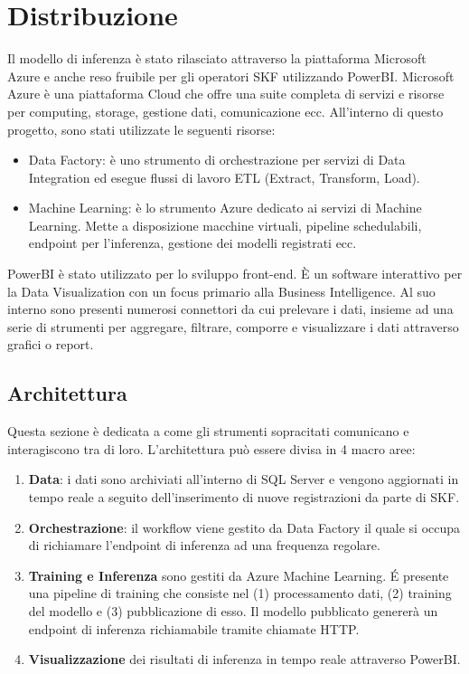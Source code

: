 \chapter{Distribuzione}
\label{chap:deploy}

Il modello di inferenza è stato rilasciato attraverso la piattaforma Microsoft Azure e anche reso fruibile per gli operatori SKF utilizzando PowerBI.
Microsoft Azure è una piattaforma Cloud che offre una suite completa di servizi e risorse per computing, storage, gestione dati, comunicazione ecc.
All'interno di questo progetto, sono stati utilizzate le seguenti risorse:
\begin{itemize}
	\item Data Factory: è uno strumento di orchestrazione per servizi di Data Integration ed esegue flussi di lavoro ETL (Extract, Transform, Load).
	\item Machine Learning: è lo strumento Azure dedicato ai servizi di Machine Learning. Mette a disposizione macchine virtuali, pipeline schedulabili, endpoint per l'inferenza, gestione dei modelli registrati ecc.
\end{itemize}

PowerBI è stato utilizzato per lo sviluppo front-end. È un software interattivo per la Data Visualization con un focus primario alla Business Intelligence. Al suo interno sono presenti numerosi connettori da cui prelevare i dati, insieme ad una serie di strumenti per aggregare, filtrare, comporre e visualizzare i dati attraverso grafici o report.

\section{Architettura}
Questa sezione è dedicata a come gli strumenti sopracitati comunicano e interagiscono tra di loro. L'architettura può essere divisa in 4 macro aree:
\begin{enumerate}
	\item \textbf{Data}: i dati sono archiviati all'interno di SQL Server e vengono aggiornati in tempo reale a seguito dell'inserimento di nuove registrazioni da parte di SKF.
	\item \textbf{Orchestrazione}: il workflow viene gestito da Data Factory il quale si occupa di richiamare l'endpoint di inferenza ad una frequenza regolare.
	\item \textbf{Training e Inferenza} sono gestiti da Azure Machine Learning. É presente una pipeline di training che consiste nel (1) processamento dati, (2) training del modello e (3) pubblicazione di esso. Il modello pubblicato genererà un endpoint di inferenza richiamabile tramite chiamate HTTP. 
	\item \textbf{Visualizzazione} dei risultati di inferenza in tempo reale attraverso PowerBI.
\end{enumerate}

